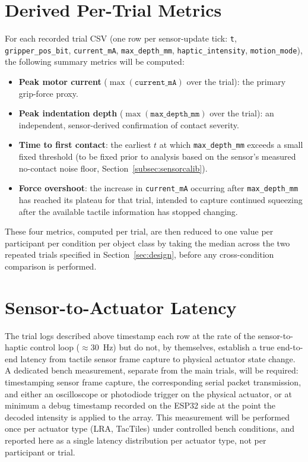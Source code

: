 \documentclass[12pt, a4paper]{report}
\begin{document}
\section{Derived Per-Trial Metrics}
\label{sec:metrics}
For each recorded trial CSV (one row per sensor-update tick: \texttt{t}, \texttt{gripper\_pos\_bit}, \texttt{current\_mA}, \texttt{max\_depth\_mm}, \texttt{haptic\_intensity}, \texttt{motion\_mode}), the following summary metrics will be computed:
\begin{itemize}
    \item \textbf{Peak motor current} ($\max(\texttt{current\_mA})$ over the trial): the primary grip-force proxy.
    \item \textbf{Peak indentation depth} ($\max(\texttt{max\_depth\_mm})$ over the trial): an independent, sensor-derived confirmation of contact severity.
    \item \textbf{Time to first contact}: the earliest $t$ at which \texttt{max\_depth\_mm} exceeds a small fixed threshold (to be fixed prior to analysis based on the sensor's measured no-contact noise floor, Section~\ref{subsec:sensorcalib}).
    \item \textbf{Force overshoot}: the increase in \texttt{current\_mA} occurring after \texttt{max\_depth\_mm} has reached its plateau for that trial, intended to capture continued squeezing after the available tactile information has stopped changing.
\end{itemize}
These four metrics, computed per trial, are then reduced to one value per participant per condition per object class by taking the median across the two repeated trials specified in Section~\ref{sec:design}, before any cross-condition comparison is performed.

\section{Sensor-to-Actuator Latency}
The trial logs described above timestamp each row at the rate of the sensor-to-haptic control loop ($\approx$30~Hz) but do not, by themselves, establish a true end-to-end latency from tactile sensor frame capture to physical actuator state change. A dedicated bench measurement, separate from the main trials, will be required: timestamping sensor frame capture, the corresponding serial packet transmission, and either an oscilloscope or photodiode trigger on the physical actuator, or at minimum a debug timestamp recorded on the ESP32 side at the point the decoded intensity is applied to the array. This measurement will be performed once per actuator type (LRA, TacTiles) under controlled bench conditions, and reported here as a single latency distribution per actuator type, not per participant or trial.
\end{document}
